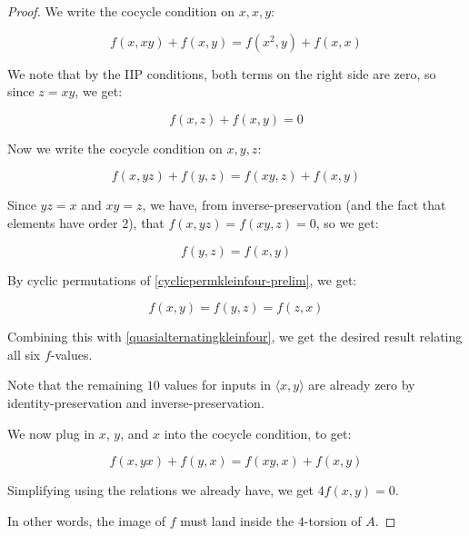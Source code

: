 \documentclass[10pt]{amsart}
\begin{document}
\begin{proof}
  We write the cocycle condition on $x,x,y$:

  \begin{equation*}
    f(x,xy)+ f(x,y) = f(x^2,y) + f(x,x)
  \end{equation*}

  We note that by the IIP conditions, both terms on the right side are
  zero, so since $z = xy$, we get:

  \begin{equation}
    f(x,z) + f(x,y) = 0 \label{quasialternatingkleinfour}
  \end{equation}

  Now we write the cocycle condition on $x,y,z$:

  \begin{equation*}
    f(x,yz) + f(y,z) = f(xy,z) + f(x,y)
  \end{equation*}

  Since $yz = x$ and $xy = z$, we have, from inverse-preservation (and
  the fact that elements have order $2$), that $f(x,yz) = f(xy,z) = 0$, so we get:

  \begin{equation}
    f(y,z) = f(x,y) \label{cyclicpermkleinfour-prelim}
  \end{equation}

  By cyclic permutations of \ref{cyclicpermkleinfour-prelim}, we get:

  \begin{equation}
    f(x,y) = f(y,z) = f(z,x)\label{cyclicpermkleinfour}
  \end{equation}
  
  Combining this with \ref{quasialternatingkleinfour}, we get the
  desired result relating all six $f$-values.

  Note that the remaining $10$ values for inputs in $\langle x,y
  \rangle$ are already zero by identity-preservation and
  inverse-preservation.

  We now plug in $x$, $y$, and $x$ into the cocycle condition, to get:

  \begin{equation*}
    f(x,yx) + f(y,x) = f(xy,x) + f(x,y)
  \end{equation*}

  Simplifying using the relations we already have, we get $4f(x,y) =
  0$.
  
  In other words, the image of $f$ must land inside the $4$-torsion of
  $A$.
\end{proof}
\end{document}

